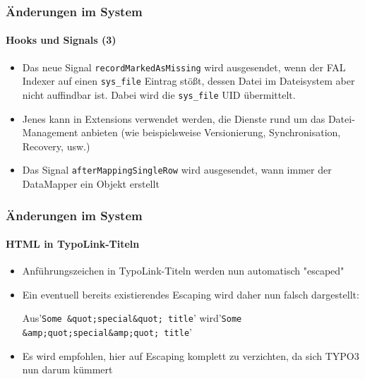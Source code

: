 \begin{frame}[fragile]
	\frametitle{Änderungen im System}
	\framesubtitle{Hooks und Signals (3)}

	\begin{itemize}

		\item Das neue Signal \texttt{recordMarkedAsMissing} wird ausgesendet, wenn der FAL Indexer auf einen
			\texttt{sys\_file} Eintrag stößt, dessen Datei im Dateisystem aber nicht auffindbar ist.
			Dabei wird die \texttt{sys\_file} UID übermittelt.

		\item Jenes kann in Extensions verwendet werden, die Dienste rund um das Datei-Management anbieten
			(wie beispielsweise Versionierung, Synchronisation, Recovery, usw.)

		\item Das Signal \texttt{afterMappingSingleRow} wird ausgesendet, wann immer der DataMapper ein Objekt erstellt

	\end{itemize}

\end{frame}


\begin{frame}[fragile]
	\frametitle{Änderungen im System}
	\framesubtitle{HTML in TypoLink-Titeln}

	\lstset{basicstyle=\tiny\ttfamily}

	\begin{itemize}

		\item Anführungszeichen in TypoLink-Titeln werden nun automatisch "escaped"
		\item Ein eventuell bereits existierendes Escaping wird daher nun falsch dargestellt:

			Aus\tabto{1.2cm}'\texttt{Some \&quot;special\&quot; title}'\newline
			wird\tabto{1.2cm}'\texttt{Some \&amp;quot;special\&amp;quot; title}'

		\item Es wird empfohlen, hier auf Escaping komplett zu verzichten, da sich TYPO3 nun darum kümmert

	\end{itemize}

	\breakingchange

\end{frame}

